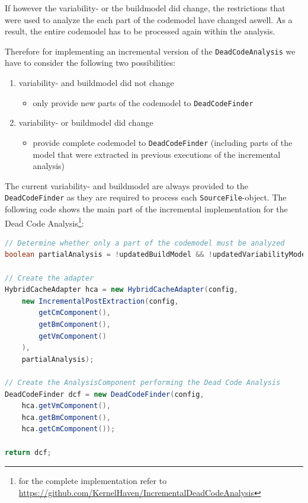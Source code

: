 \documentclass[a4paper]{article}
\begin{document}
If however the variability- or the buildmodel did change, the restrictions that were used to analyze the each part of the codemodel have changed aswell. As a result, the entire codemodel has to be processed again within the analysis.

Therefore for implementing an incremental version of the \texttt{DeadCodeAnalysis} we have to consider the following two possibilities:

\begin{enumerate}
 \item variability- and buildmodel did not change
 \begin{itemize}
 	\item only provide new parts of the codemodel to \texttt{DeadCodeFinder}
 \end{itemize}
  \item variability- or buildmodel did change
 \begin{itemize}
 	\item provide complete codemodel to \texttt{DeadCodeFinder} (including parts of the model that were extracted in previous executions of the incremental analysis)
 \end{itemize}
\end{enumerate}

The current variability- and buildmodel are always provided to the \texttt{DeadCodeFinder} as they are required to process each \texttt{SourceFile}-object. The following code shows the main part of the incremental implementation for the Dead Code Analysis\footnote{for the complete implementation refer to \url{https://github.com/KernelHaven/IncrementalDeadCodeAnalysis}}:

\begin{lstlisting}[language=java]
// Determine whether only a part of the codemodel must be analyzed
boolean partialAnalysis = !updatedBuildModel && !updatedVariabilityModel;

// Create the adapter
HybridCacheAdapter hca = new HybridCacheAdapter(config,
    new IncrementalPostExtraction(config, 
        getCmComponent(), 
        getBmComponent(), 
        getVmComponent()
    ),
    partialAnalysis);

// Create the AnalysisComponent performing the Dead Code Analysis
DeadCodeFinder dcf = new DeadCodeFinder(config, 
    hca.getVmComponent(), 
    hca.getBmComponent(),
    hca.getCmComponent());

return dcf;
\end{lstlisting}
\end{document}
